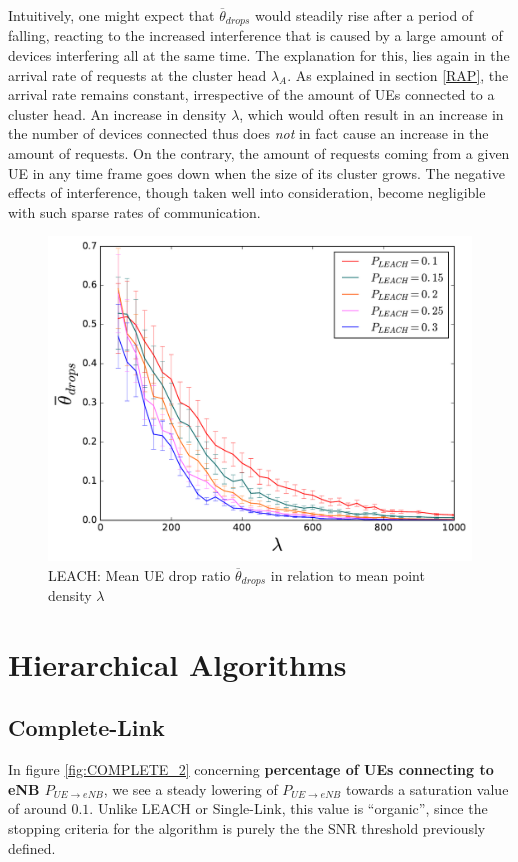 Intuitively, one might expect that $\overline{\theta}_{drops}$ would steadily rise after a period of falling, reacting to the increased interference that is caused by a large amount of devices interfering all at the same time. The explanation for this, lies again in the arrival rate of requests at the cluster head $\lambda_A$. As explained in section \ref{RAP}, the arrival rate remains constant, irrespective of the amount of UEs connected to a cluster head. An increase in density $\lambda$, which would often result in an increase in the number of devices connected thus does \textit{not} in fact cause an increase in the amount of requests. On the contrary, the amount of requests coming from a given UE in any time frame goes down when the size of its cluster grows. The negative effects of interference, though taken well into consideration, become negligible with such sparse rates of communication.

\begin{figure}
\centering
\captionsetup{justification=centering}
\includegraphics[width=0.7\linewidth]{figures/LEACHLINES_10}
\caption{LEACH: Mean UE drop ratio $\overline{\theta}_{drops}$ in relation to mean point density $\lambda$ }
\label{fig:LEACHLINES_10}
\end{figure}

\clearpage

\section{Hierarchical Algorithms}\label{description:HIERA}
\subsection{Complete-Link}\label{description:COMPLETE}


In figure \ref{fig:COMPLETE_2} concerning \textbf{percentage of UEs connecting to eNB $P_{UE\rightarrow eNB}$}, we see a steady lowering of $P_{UE\rightarrow eNB}$ towards a saturation value of around $0.1$. Unlike LEACH or Single-Link, this value is ``organic'', since the stopping criteria for the algorithm is purely the the SNR threshold previously defined. 

